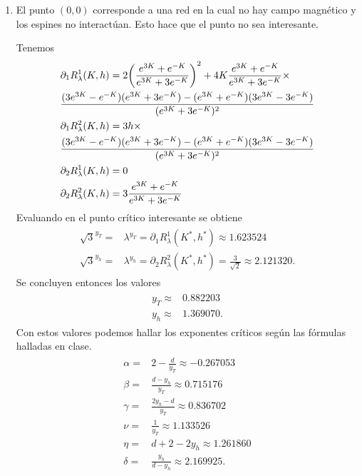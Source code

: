 \documentclass{article}
\begin{document}
\begin{enumerate}
\item El punto $(0,0)$ corresponde a una red en la cual no hay campo magnético y los espines no interactúan. Esto hace que el punto no sea interesante.

Tenemos
\begin{align}
\begin{split}
&\partial_1 R_\lambda^1(K,h)=2\qty(\frac{e^{3K}+e^{-K}}{e^{3K}+3e^{-K}})^2+4K\frac{e^{3K}+e^{-K}}{e^{3K}+3e^{-K}}\times\\
&\frac{(3e^{3K}-e^{-K})(e^{3K}+3e^{-K})-(e^{3K}+e^{-K})(3e^{3K}-3e^{-K})}{(e^{3K}+3e^{-K})^2}\\
&\partial_1 R_\lambda^2(K,h)=3h\times\\
&\frac{(3e^{3K}-e^{-K})(e^{3K}+3e^{-K})-(e^{3K}+e^{-K})(3e^{3K}-3e^{-K})}{(e^{3K}+3e^{-K})^2}\\
&\partial_2 R_\lambda^1(K,h)=0\\
&\partial_2 R_\lambda^2(K,h)=3\frac{e^{3K}+e^{-K}}{e^{3K}+3e^{-K}}
\end{split}
\end{align} 
Evaluando en el punto crítico interesante se obtiene
\begin{align}
\begin{split}
\sqrt{3}^{y_T}=&\lambda^{y_T}=\partial_1 R_\lambda^1(K^*,h^*)\approx 1.623524\\
\sqrt{3}^{y_h}=&\lambda^{y_h}=\partial_2 R_\lambda^2(K^*,h^*)=\frac{3}{\sqrt{2}}\approx 2.121320.
\end{split}
\end{align}
Se concluyen entonces los valores
\begin{align}
\begin{split}
y_T\approx&0.882203\\
y_h\approx&1.369070.
\end{split}
\end{align}
Con estos valores podemos hallar los exponentes críticos según las fórmulas halladas en clase. 
\begin{align}
\begin{split}
\alpha=&2-\frac{d}{y_T}\approx -0.267053\\
\beta=&\frac{d-y_h}{y_T}\approx 0.715176\\
\gamma =&\frac{2y_h-d}{y_T}\approx 0.836702\\
\nu =&\frac{1}{y_T}\approx 1.133526\\
\eta = &d+2-2y_h\approx 1.261860\\
\delta =&\frac{y_h}{d-y_h}\approx 2.169925.
\end{split}
\end{align}

\end{enumerate}



\end{document}
